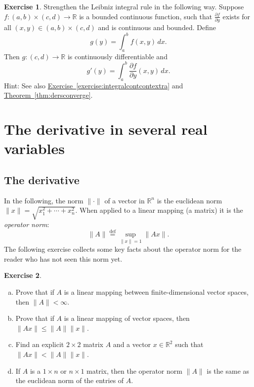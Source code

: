 \documentclass[12pt,openany]{book}
\newcommand{\glsadd}[2][]{}
\newcommand{\snorm}[1]{\lVert {#1} \rVert}
\newcommand{\R}{{\mathbb{R}}}
\newcommand{\myindex}[1]{#1\index{#1}}
\theoremstyle{plain}
\theoremstyle{remark}
\theoremstyle{definition}
\newenvironment{exbox}{%
    \def\FrameCommand{\vrule width 1pt \relax\hspace{10pt}}%
    \MakeFramed{\advance\hsize-\width\FrameRestore}%
}{%
    \endMakeFramed
}
\newenvironment{exparts}{%
    \leavevmode\begin{enumerate}[a),noitemsep,topsep=0pt,parsep=0pt,partopsep=0pt]
}{%
    \end{enumerate}
}
\theoremstyle{exercise}
\newtheorem{exercise}{Exercise}[section]
\theoremstyle{example}
\newcommand{\exerciseref}[1]{\hyperref[#1]{Exercise~\ref*{#1}}}
\newcommand{\thmref}[1]{\hyperref[#1]{Theorem~\ref*{#1}}}
\begin{document}
\begin{exbox}
\begin{exercise} \label{exercise:strongerleibniz}
Strengthen the Leibniz integral rule in the following way.
Suppose $f \colon (a,b) \times (c,d) \to \R$ is a bounded continuous function,
such that $\frac{\partial f}{\partial y}$ exists for all $(x,y) \in (a,b)
\times (c,d)$ and is continuous and bounded.  Define
\begin{equation*}
g(y) = \int_a^b f(x,y) \,dx .
\end{equation*}
Then $g \colon (c,d) \to \R$ is continuously differentiable and
\begin{equation*}
g'(y) = \int_a^b \frac{\partial f}{\partial y}(x,y) \,dx .
\end{equation*}
Hint: See also \exerciseref{exercise:integralcontcontextra} and
\thmref{thm:dersconverge}.
\end{exercise}
\end{exbox}


\section{The derivative in several real variables} \label{sec:derinsv}

\subsection{The derivative}

In the following, the norm $\snorm{\cdot}$ of a vector in $\R^n$
is the euclidean norm
\glsadd{not:euclidnorm}%
$\snorm{x} = \sqrt{x_1^2+\cdots+x_n^2}$.
When applied to a linear mapping (a matrix) it is the
\glsadd{not:operatornorm}%
\emph{\myindex{operator norm}}:
\begin{equation*}
\snorm{A} \overset{\text{def}}{=} \sup_{\snorm{x} = 1} \snorm{Ax} .
\end{equation*}
The following exercise collects some key facts about the operator norm
for the reader who has not seen this norm yet.

\begin{exbox}
\begin{exercise}
\begin{exparts} 
\item
Prove that if $A$ is a linear mapping between finite-dimensional vector
spaces, then $\snorm{A} < \infty$.
\item
Prove that if $A$ is a linear mapping of vector spaces, then
$\snorm{Ax} \leq \snorm{A} \snorm{x}$.
\item
Find an explicit $2 \times 2$ matrix $A$ and a vector $x \in \R^2$
such that $\snorm{Ax} < \snorm{A} \snorm{x}$.
\item
If $A$ is a $1 \times n$ or $n \times 1$ matrix, then the operator norm
$\snorm{A}$ is the same as the euclidean norm of the entries of $A$.
\end{exparts} 
\end{exercise}
\end{exbox}
\end{document}
